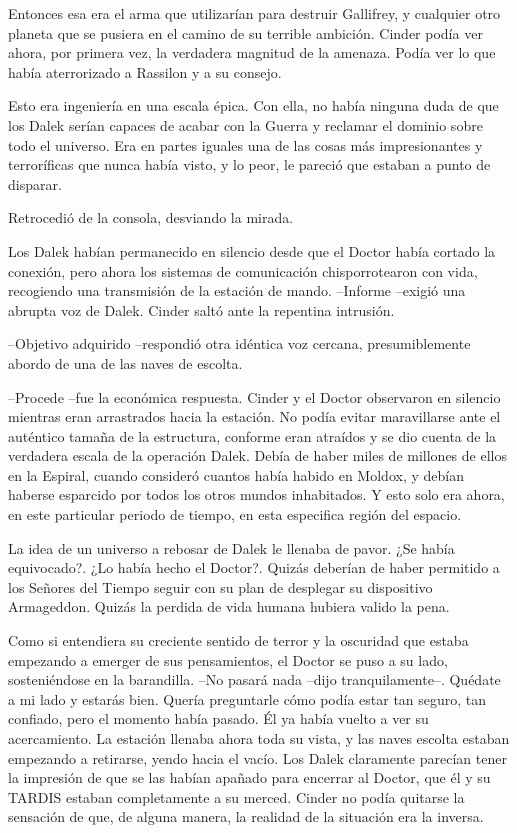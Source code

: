 Entonces esa era el arma que utilizarían para destruir Gallifrey, y cualquier otro planeta que se pusiera en el camino de su terrible ambición. Cinder podía ver ahora, por primera vez, la verdadera magnitud de la amenaza. Podía ver lo que había aterrorizado a Rassilon y a su consejo.

Esto era ingeniería en una escala épica. Con ella, no había ninguna duda de que los Dalek serían capaces de acabar con la Guerra y reclamar el dominio sobre todo el universo. Era en partes iguales una de las cosas más impresionantes y terroríficas que nunca había visto, y lo peor, le pareció que estaban a punto de disparar.

Retrocedió de la consola, desviando la mirada.

Los Dalek habían permanecido en silencio desde que el Doctor había cortado la conexión, pero ahora los sistemas de comunicación chisporrotearon con vida, recogiendo una transmisión de la estación de mando.
--Informe --exigió una abrupta voz de Dalek. Cinder saltó ante la repentina intrusión.

--Objetivo adquirido --respondió otra idéntica voz cercana, presumiblemente abordo de una de las naves de escolta.

--Procede --fue la económica respuesta.
Cinder y el Doctor observaron en silencio mientras eran arrastrados hacia la estación. No podía evitar maravillarse ante el auténtico tamaña de la estructura, conforme eran atraídos y se dio cuenta de la verdadera escala de la operación Dalek. Debía de haber miles de millones de ellos en la Espiral, cuando consideró cuantos había habido en Moldox, y debían haberse esparcido por todos los otros mundos inhabitados. Y esto solo era ahora, en este particular periodo de tiempo, en esta especifica región del espacio.

La idea de un universo a rebosar de Dalek le llenaba de pavor. ¿Se había equivocado?. ¿Lo había hecho el Doctor?. Quizás deberían de haber permitido a los Señores del Tiempo seguir con su plan de desplegar su dispositivo Armageddon. Quizás la perdida de vida humana hubiera valido la pena.

Como si entendiera su creciente sentido de terror y la oscuridad que estaba empezando a emerger de sus pensamientos, el Doctor se puso a su lado, sosteniéndose en la barandilla. 
--No pasará nada --dijo tranquilamente--. Quédate a mi lado y estarás bien.
Quería preguntarle cómo podía estar tan seguro, tan confiado, pero el momento había pasado. Él ya había vuelto a ver su acercamiento. La estación llenaba ahora toda su vista, y las naves escolta estaban empezando a retirarse, yendo hacia el vacío. Los Dalek claramente parecían tener la impresión de que se las habían apañado para encerrar al Doctor, que él y su TARDIS estaban completamente a su merced. Cinder no podía quitarse la sensación de que, de alguna manera, la realidad de la situación era la inversa.

